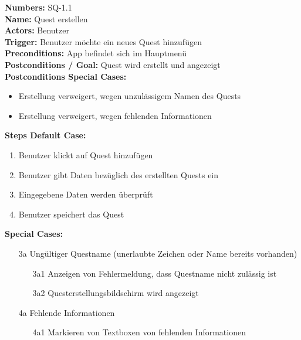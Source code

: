 \documentclass{article}
\begin{document}
\newpage
\begin{samepage}
\textbf{Numbers:} SQ-1.1\\
\textbf{Name:} Quest erstellen\\
\textbf{Actors:} Benutzer\\
\textbf{Trigger:} Benutzer möchte ein neues Quest hinzufügen\\
\textbf{Preconditions:}  App befindet sich im Hauptmenü\\
\textbf{Postconditions / Goal:} Quest wird erstellt und angezeigt\\
\textbf{Postconditions Special Cases:}
\begin{itemize}
    \item Erstellung verweigert, wegen unzulässigem Namen des Quests
    \item Erstellung verweigert, wegen fehlenden Informationen
\end{itemize}
\textbf{Steps Default Case:} 
\begin{enumerate}
    \item Benutzer klickt auf Quest hinzufügen
    \item Benutzer gibt Daten bezüglich des erstellten Quests ein 
    \item Eingegebene Daten werden überprüft 
    \item Benutzer speichert das Quest
\end{enumerate}
\textbf{Special Cases:}
\begin{itemize}
    \item [3a] Ungültiger Questname (unerlaubte Zeichen oder Name bereits vorhanden)
    \begin{itemize}
        \item [3a1] Anzeigen von Fehlermeldung, dass Questname nicht zulässig ist
        \item [3a2] Questerstellungsbildschirm wird angezeigt
    \end{itemize}
    \item [4a] Fehlende Informationen
    \begin{itemize}
        \item [4a1] Markieren von Textboxen von fehlenden Informationen
    \end{itemize}
\end{itemize}
\end{samepage}
\end{document}
